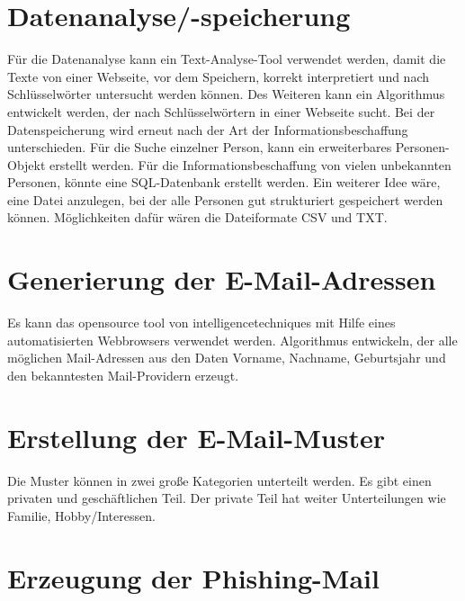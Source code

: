 \section{Datenanalyse/-speicherung}
Für die Datenanalyse kann ein Text-Analyse-Tool verwendet werden, damit die Texte von einer Webseite, vor dem Speichern, korrekt interpretiert und nach Schlüsselwörter untersucht werden können. Des Weiteren kann ein Algorithmus entwickelt werden, der nach Schlüsselwörtern in einer Webseite sucht.%
Bei der Datenspeicherung wird erneut nach der Art der Informationsbeschaffung unterschieden. Für die Suche einzelner Person, kann ein erweiterbares Personen-Objekt erstellt werden. Für die Informationsbeschaffung von vielen unbekannten Personen, könnte eine SQL-Datenbank erstellt werden. Ein weiterer Idee wäre, eine Datei anzulegen, bei der alle Personen gut strukturiert gespeichert werden können. Möglichkeiten dafür wären die Dateiformate CSV und TXT.%

\section{Generierung der E-Mail-Adressen}
Es kann das opensource tool von intelligencetechniques mit Hilfe eines automatisierten Webbrowsers verwendet werden. Algorithmus entwickeln, der alle möglichen Mail-Adressen aus den Daten Vorname, Nachname, Geburtsjahr und den bekanntesten Mail-Providern erzeugt.

\section{Erstellung der E-Mail-Muster}
Die Muster können in zwei große Kategorien unterteilt werden. Es gibt einen privaten und geschäftlichen Teil. Der private Teil hat weiter Unterteilungen wie Familie, Hobby/Interessen.
\section{Erzeugung der Phishing-Mail}
